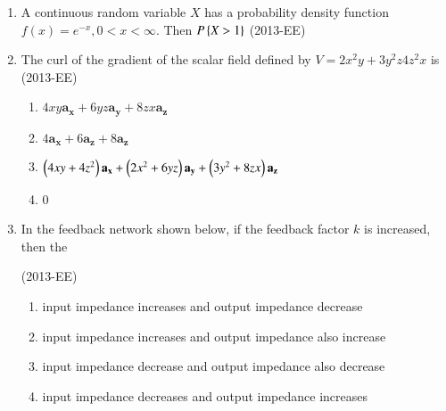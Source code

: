 \documentclass[journal]{IEEEtran}
\begin{document}
\begin{enumerate}
    \item A continuous random variable $X$ has a probability density function $f(x) = e^{-x}, 0 < x < \infty$. Then $P\left\{X > 1\right\}$ \hfill(2013-EE)
    \begin{enumerate}
    \end{enumerate}
    \item The curl of the gradient of the scalar field defined by $V = 2x^2y + 3y^2z 
 4z^2x$ is \hfill(2013-EE)
 \begin{enumerate}
     \item $4xy\textbf{a}_\textbf{x} + 6yz\textbf{a}_\textbf{y} + 8zx \textbf{a}_ \textbf{z}$
     \item $4\textbf{a}_\textbf{x}+ 6\textbf{a}_\textbf{z}+ 8\textbf{a}_\textbf{z}$
     \item $\left(4xy + 4z^2\right)\textbf{a}_\textbf{x} + \left(2x^2 + 6yz\right)\textbf{a}_\textbf{y} + \left(3y^2 + 8zx\right)\textbf{a}_\textbf{z}$
     \item 0
 \end{enumerate}
 \item In the feedback network shown below, if the feedback factor $k$ is increased, then the 

 \hfill(2013-EE)
 
 \begin{enumerate}
     \item input impedance increases and output impedance decrease  
     \item input impedance increases and output impedance also increase 
     \item input impedance decrease  and output impedance also decrease  
     \item input impedance decreases and output impedance increases
 \end{enumerate}
\end{enumerate}
\end{document}
